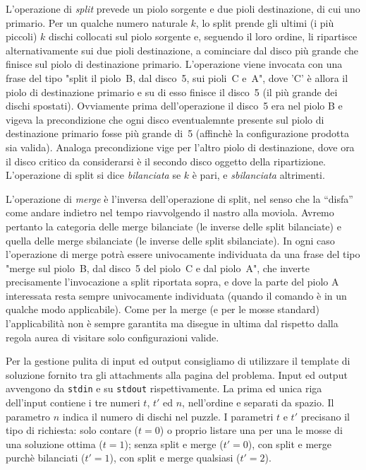 L'operazione di \emph{split} prevede un piolo sorgente e due pioli destinazione, di cui uno primario. Per un qualche numero naturale $k$, lo split prende gli ultimi (i più piccoli) $k$ dischi collocati sul piolo sorgente e, seguendo il loro ordine, li ripartisce alternativamente sui due pioli destinazione, a cominciare dal disco più grande che finisce sul piolo di destinazione primario. L'operazione viene invocata con una frase del tipo "split il piolo~B, dal disco~5, sui pioli~C e~A", dove 'C' è allora il piolo di destinazione primario e su di esso finisce il disco~5 (il più grande dei dischi spostati).
Ovviamente prima dell'operazione il disco~5 era nel piolo B e vigeva la precondizione che ogni disco eventualemnte presente sul piolo di destinazione primario fosse più grande di~5 (affinchè la configurazione prodotta sia valida). Analoga precondizione vige per l'altro piolo di destinazione, dove ora il disco critico da considerarsi è il secondo disco oggetto della ripartizione.
L'operazione di split si dice \emph{bilanciata} se $k$ è pari, e \emph{sbilanciata} altrimenti. 

L'operazione di \emph{merge} è l'inversa dell'operazione di split, nel senso che la ``disfa'' come andare indietro nel tempo riavvolgendo il nastro alla moviola. Avremo pertanto la categoria delle merge bilanciate (le inverse delle split bilanciate) e quella delle merge sbilanciate (le inverse delle split sbilanciate).
In ogni caso l'operazione di merge potrà essere univocamente individuata da una frase del tipo "merge sul piolo~B, dal disco~5 del piolo~C e dal piolo~A", che inverte precisamente l'invocazione a split riportata sopra, e dove la parte del piolo A interessata resta sempre univocamente individuata (quando il comando è in un qualche modo applicabile). Come per la merge (e per le mosse standard) l'applicabilità non è sempre garantita ma disegue in ultima dal rispetto dalla regola aurea di visitare solo configurazioni valide.


Per la gestione pulita di input ed output consigliamo di utilizzare il template di soluzione fornito tra gli attachments alla pagina del problema.
Input ed output avvengono da \verb'stdin' e su \verb'stdout' rispettivamente.
La prima ed unica riga dell'input contiene i tre numeri $t$, $t'$ ed $n$, nell'ordine e separati da spazio.
Il parametro $n$ indica il numero di dischi nel puzzle. I parametri $t$ e $t'$ precisano il tipo di richiesta: solo contare ($t=0$) o proprio listare una per una le mosse di una soluzione ottima ($t=1$); senza split e merge ($t'=0$), con split e merge purchè bilanciati ($t'=1$), con split e merge qualsiasi ($t'=2$).

